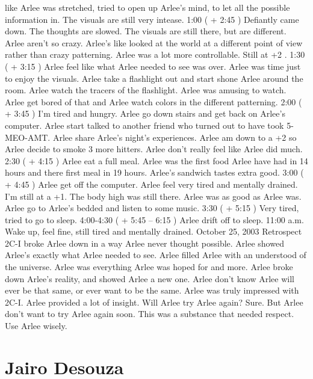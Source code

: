 \documentclass[12pt]{book}
\begin{document}
like Arlee was stretched, tried to open up Arlee's mind, to let all the possible information in. The visuals are still very intease. 1:00 ( + 2:45 ) Defiantly came down. The thoughts are slowed. The visuals are still there, but are different. Arlee aren't so crazy. Arlee's like looked at the world at a different point of view rather than crazy patterning. Arlee was a lot more controllable. Still at +2 . 1:30 ( + 3:15 ) Arlee feel like what Arlee needed to see was over. Arlee was time just to enjoy the visuals. Arlee take a flashlight out and start shone Arlee around the room. Arlee watch the tracers of the flashlight. Arlee was amusing to watch. Arlee get bored of that and Arlee watch colors in the different patterning. 2:00 ( + 3:45 ) I'm tired and hungry. Arlee go down stairs and get back on Arlee's computer. Arlee start talked to another friend who turned out to have took 5-MEO-AMT. Arlee share Arlee's night's experiences. Arlee am down to a +2 so Arlee decide to smoke 3 more hitters. Arlee don't really feel like Arlee did much. 2:30 ( + 4:15 ) Arlee eat a full meal. Arlee was the first food Arlee have had in 14 hours and there first meal in 19 hours. Arlee's sandwich tastes extra good. 3:00 ( + 4:45 ) Arlee get off the computer. Arlee feel very tired and mentally drained. I'm still at a +1. The body high was still there. Arlee was as good as Arlee was. Arlee go to Arlee's bedded and listen to some music. 3:30 ( + 5:15 ) Very tired, tried to go to sleep. 4:00-4:30 ( + 5:45 -- 6:15 ) Arlee drift off to sleep. 11:00 a.m. Wake up, feel fine, still tired and mentally drained. October 25, 2003 Retrospect 2C-I broke Arlee down in a way Arlee never thought possible. Arlee showed Arlee's exactly what Arlee needed to see. Arlee filled Arlee with an understood of the universe. Arlee was everything Arlee was hoped for and more. Arlee broke down Arlee's reality, and showed Arlee a new one. Arlee don't know Arlee will ever be that same, or ever want to be the same. Arlee was truly impressed with 2C-I. Arlee provided a lot of insight. Will Arlee try Arlee again? Sure. But Arlee don't want to try Arlee again soon. This was a substance that needed respect. Use Arlee wisely.



\chapter{Jairo Desouza}
\end{document}
